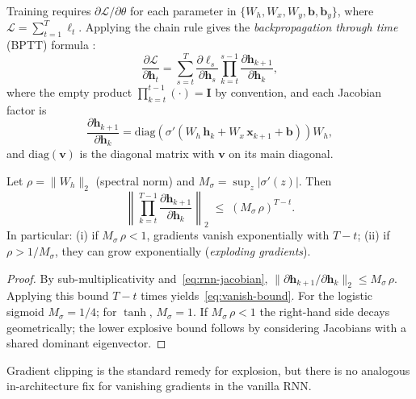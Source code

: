 \begin{deepdive}
Training requires $\partial \mathcal{L} / \partial \theta$ for each parameter in
$\{W_h, W_x, W_y, \mathbf{b}, \mathbf{b}_y\}$,
where $\mathcal{L} = \sum_{t=1}^{T} \ell_t$.
Applying the chain rule gives the \emph{backpropagation through time} (BPTT)
formula \cite{werbos1990bptt}: %
\begin{equation}
  \frac{\partial \mathcal{L}}{\partial \mathbf{h}_t}
  = \sum_{s=t}^{T}
    \frac{\partial \ell_s}{\partial \mathbf{h}_s}
    \prod_{k=t}^{s-1} \frac{\partial \mathbf{h}_{k+1}}{\partial \mathbf{h}_k},
  \label{eq:bptt-chain}
\end{equation}
where the empty product $\prod_{k=t}^{t-1}(\cdot) = \mathbf{I}$ by convention, and each Jacobian factor is
\begin{equation}
  \frac{\partial \mathbf{h}_{k+1}}{\partial \mathbf{h}_k}
  = \mathrm{diag}\!\left(\sigma'\!\left(W_h\,\mathbf{h}_k +
    W_x\,\mathbf{x}_{k+1} + \mathbf{b}\right)\right) W_h,
  \label{eq:rnn-jacobian}
\end{equation}
and $\mathrm{diag}(\mathbf{v})$ is the diagonal matrix with $\mathbf{v}$ on its
main diagonal.

\begin{proposition}
\label{thm:vanish-explode}
Let $\rho = \|W_h\|_2$ (spectral norm) and $M_\sigma = \sup_z |\sigma'(z)|$.
Then
\begin{equation}
  \left\|\prod_{k=t}^{T-1}
    \frac{\partial \mathbf{h}_{k+1}}{\partial \mathbf{h}_k}\right\|_2
  \;\leq\; \left(M_\sigma\,\rho\right)^{T-t}.
  \label{eq:vanish-bound}
\end{equation}
In particular: (i) if $M_\sigma\,\rho < 1$, gradients vanish exponentially with
$T-t$; (ii) if $\rho > 1/M_\sigma$, they can grow exponentially
(\emph{exploding gradients}).
\end{proposition}

\begin{proof}
By sub-multiplicativity and~\eqref{eq:rnn-jacobian},
$\|\partial \mathbf{h}_{k+1}/\partial \mathbf{h}_k\|_2 \leq M_\sigma\,\rho$.
Applying this bound $T-t$ times yields~\eqref{eq:vanish-bound}.
For the logistic sigmoid $M_\sigma = 1/4$; for $\tanh$, $M_\sigma = 1$.
If $M_\sigma\,\rho < 1$ the right-hand side decays geometrically; the lower
explosive bound follows by considering Jacobians with a shared dominant eigenvector.
\end{proof}

\begin{remark}
Gradient clipping \cite{pascanu2013gradient} %
is the standard remedy for explosion, but there is no analogous in-architecture fix
for vanishing gradients in the vanilla RNN.
\end{remark}


\end{deepdive}

